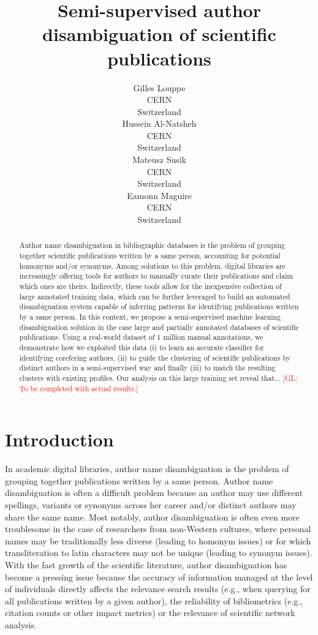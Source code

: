 \documentclass{article}
\title{Semi-supervised author disambiguation of scientific publications}
\author{Gilles Louppe\\
        CERN\\
        Switzerland\\
\And Hussein Al-Natsheh\\
        CERN\\
        Switzerland\\
\And Mateusz Susik\\
        CERN\\
        Switzerland\\
\And Eamonn Maguire\\
        CERN\\
        Switzerland}
\date{}
\newcommand{\glnote}[1]{\textcolor{red}{[GL: #1]}}
\begin{document}
\maketitle

\begin{abstract}

Author name disambiguation in bibliographic databases is the problem of
grouping together scientific publications written by a same person, accounting
for potential homonyms and/or synonyms. Among solutions to this problem, digital
libraries are increasingly offering tools for authors to manually curate their
publications and claim which ones are theirs. Indirectly, these tools allow for
the inexpensive collection of large annotated training data, which can be
further leveraged to build an automated disambiguation system capable of
inferring patterns for identifying publications written by a same
person.  In this context, we propose a semi-supervised machine learning
disambiguation solution in the case large and partially annotated databases of
scientific publications. Using a real-world dataset of 1 million manual
annotations, we demonstrate how we exploited this data (i) to learn an accurate
classifier for identifying corefering authors, (ii) to guide the clustering of
scientific publications by distinct authors in a semi-supervised way and
finally (iii) to match the resulting clusters with existing profiles.  Our
analysis on this large training set reveal that...
\glnote{To be completed with actual results.}

\end{abstract}



\section{Introduction}
\label{introduction}


In academic digital libraries, author name disambiguation is the problem of
grouping together publications written by a same person.  Author name
disambiguation is often a difficult problem because an author may use different
spellings, variants or synonyms across her career and/or distinct authors may
share the same name. Most notably, author disambiguation is often even more
troublesome in the case of researchers from non-Western cultures, where
personal names may be traditionally less diverse (leading to homonym issues) or
for which transliteration to latin characters may not be unique (leading to
synonym issues). With the fast growth of the scientific literature, author
disambiguation has become a pressing issue because the accuracy of information
managed at the level of individuals directly affects the relevance search
results (e.g., when querying for all publications written by a given author),
the reliability of bibliometrics (e.g., citation counts or other impact
metrics) or the relevance of scientific network analysis.
\end{document}
